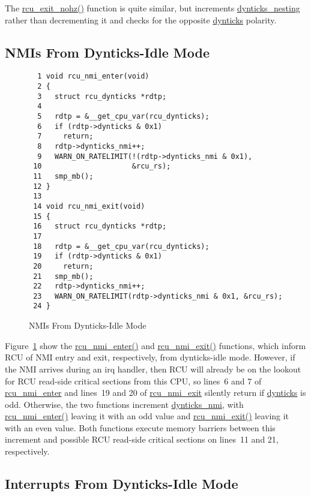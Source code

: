 The \url{rcu_exit_nohz()} function is quite similar, but increments
\url{dynticks_nesting} rather than decrementing it and checks for
the opposite \url{dynticks} polarity.

\subsection{NMIs From Dynticks-Idle Mode}
\label{app:formal:NMIs From Dynticks-Idle Mode}

\begin{figure}[tbp]
{ \scriptsize
\begin{verbatim}
  1 void rcu_nmi_enter(void)
  2 {
  3   struct rcu_dynticks *rdtp;
  4 
  5   rdtp = &__get_cpu_var(rcu_dynticks);
  6   if (rdtp->dynticks & 0x1)
  7     return;
  8   rdtp->dynticks_nmi++;
  9   WARN_ON_RATELIMIT(!(rdtp->dynticks_nmi & 0x1),
 10                     &rcu_rs);
 11   smp_mb();
 12 }
 13 
 14 void rcu_nmi_exit(void)
 15 {
 16   struct rcu_dynticks *rdtp;
 17 
 18   rdtp = &__get_cpu_var(rcu_dynticks);
 19   if (rdtp->dynticks & 0x1)
 20     return;
 21   smp_mb();
 22   rdtp->dynticks_nmi++;
 23   WARN_ON_RATELIMIT(rdtp->dynticks_nmi & 0x1, &rcu_rs);
 24 }
\end{verbatim}
}
\caption{NMIs From Dynticks-Idle Mode}
\label{fig:app:formal:NMIs From Dynticks-Idle Mode}
\end{figure}

Figure~\ref{fig:app:formal:NMIs From Dynticks-Idle Mode}
show the \url{rcu_nmi_enter()} and \url{rcu_nmi_exit()} functions,
which inform RCU of NMI entry and exit, respectively, from dynticks-idle
mode.
However, if the NMI arrives during an irq handler, then RCU will already
be on the lookout for RCU read-side critical sections from this CPU,
so lines~6 and 7 of \url{rcu_nmi_enter} and lines~19 and 20
of \url{rcu_nmi_exit} silently return if \url{dynticks} is odd.
Otherwise, the two functions increment \url{dynticks_nmi}, with
\url{rcu_nmi_enter()} leaving it with an odd value and \url{rcu_nmi_exit()}
leaving it with an even value.
Both functions execute memory barriers between this increment
and possible RCU read-side critical sections on lines~11 and 21,
respectively.

\subsection{Interrupts From Dynticks-Idle Mode}
\label{app:formal:Interrupts From Dynticks-Idle Mode}

